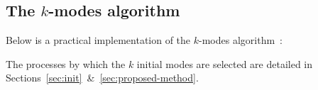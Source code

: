 \subsection{The \(k\)-modes algorithm}\label{subsec:kmodes}

Below is a practical implementation of the \(k\)-modes algorithm~\cite{Huang98}:

\begin{singlespace}
    
    \vspace{-5pt}
\end{singlespace}

\begin{remark}
    The processes by which the \(k\) initial modes are selected are detailed in 
    Sections~\ref{sec:init}~\&~\ref{sec:proposed-method}.
\end{remark}
